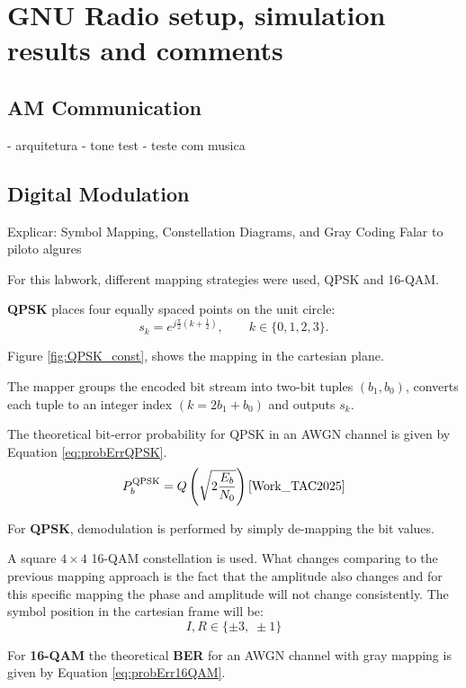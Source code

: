 \section{GNU Radio setup, simulation results and comments}

\subsection{AM Communication}

    - arquitetura
    - tone test 
    - teste com musica

\subsection{Digital Modulation}

Explicar:
    Symbol Mapping, Constellation Diagrams, and Gray Coding
    Falar to piloto algures


\label{ssec:modulations}
For this labwork, different mapping strategies were used, QPSK and 16-QAM.

\textbf{QPSK} places four equally spaced points on the unit circle:
\[
s_k = e^{j\frac{\pi}{2}\left(k+\tfrac12\right)}, \qquad k\in\{0,1,2,3\}.
\]

Figure \ref{fig:QPSK_const}, shows the mapping in the cartesian plane.


The mapper groups the encoded bit stream into two-bit tuples $(b_1,b_0)$, converts each tuple to an integer index $(k =2b_1+b_0)$ and outputs \(s_k\).

The theoretical bit-error probability for QPSK in an AWGN channel is given by Equation \ref{eq:probErrQPSK}.
\begin{equation}
  P_b^{\text{QPSK}} = Q\left(\sqrt{2\frac{E_b}{N_0}}\right)\text{\cite{Work_TAC2025}}
  \label{eq:probErrQPSK}
\end{equation}

For \textbf{QPSK}, demodulation is performed by simply de-mapping the bit values.


A square $4\times4$ 16-QAM constellation is used. What changes comparing to the previous mapping approach is the fact that the amplitude also changes and for this specific mapping the phase and amplitude will not change consistently. The symbol position in the cartesian frame will be:
\[
I,R \in \{\pm3,\;\pm1\}
\]

For \textbf{16-QAM} the theoretical \textbf{BER} for an AWGN channel with gray mapping is given by Equation \ref{eq:probErr16QAM}.

